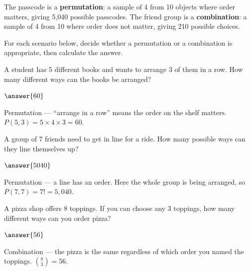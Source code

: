 \documentclass[12pt]{ximera}
\begin{document}
The passcode is a \textbf{permutation}: a sample of 4 from 10 objects where order matters,
giving 5,040 possible passcodes. The friend group is a \textbf{combination}: a sample of 4
from 10 where order does not matter, giving 210 possible choices.

For each scenario below, decide whether a permutation or a combination is appropriate,
then calculate the answer.

\begin{problem}
A student has 5 different books and wants to arrange 3 of them in a row. How many
different ways can the books be arranged?
\begin{multipleChoice}
\end{multipleChoice}

$\answer{60}$

\begin{solution}
Permutation --- ``arrange in a row'' means the order on the shelf matters.
$P(5,3) = 5 \times 4 \times 3 = 60$.
\end{solution}
\end{problem}

\begin{problem}
A group of 7 friends need to get in line for a ride. How many possible ways can they line
themselves up?
\begin{multipleChoice}
\end{multipleChoice}

$\answer{5040}$

\begin{solution}
Permutation --- a line has an order. Here the whole group is being arranged, so
$P(7,7) = 7! = 5{,}040$.
\end{solution}
\end{problem}

\begin{problem}
A pizza shop offers 8 toppings. If you can choose any 3 toppings, how many different ways
can you order pizza?
\begin{multipleChoice}
\end{multipleChoice}

$\answer{56}$

\begin{solution}
Combination --- the pizza is the same regardless of which order you named the toppings.
$\binom{8}{3} = 56$.
\end{solution}
\end{problem}
\end{document}
